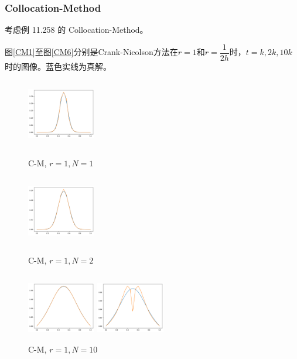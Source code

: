 \documentclass{ctexart}
\begin{document}
\subsubsection{Collocation-Method}

考虑例 11.258 的 Collocation-Method。

图\ref{CM1}至图\ref{CM6}分别是Crank-Nicolson方法在$r=1$和$r=\dfrac 1{2h}$时，$t=k,2k,10k$时的图像。蓝色实线为真解。

\begin{figure}[htbp]
	\begin{minipage}{5cm}
		\centering
		\includegraphics[width = 3cm, height = 3cm]{1-4-1.png}
		\caption{C-M, $r=1,N=1$}
		\label{CM1}
	\end{minipage}
	\begin{minipage}{5cm}
		\centering
		\includegraphics[width = 3cm, height = 3cm]{1-4-2.png}
		\caption{C-M, $r=1,N=2$}
		\label{CM2}
	\end{minipage}
	\begin{minipage}{5cm}
		\centering
		\includegraphics[width = 3cm, height = 3cm]{1-4-3.png}
		\caption{C-M, $r=1,N=10$}
		\label{CM3}
	\end{minipage}
	\begin{minipage}{5cm}
		\centering
		\includegraphics[width = 3cm, height = 3cm]{2-2-1.png}

\end{minipage}
\end{figure}
\end{document}

